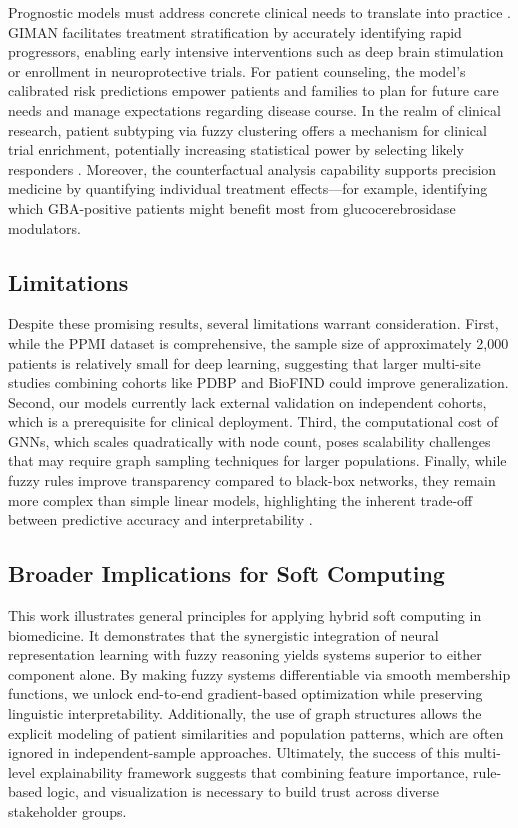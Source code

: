 \documentclass[conference]{IEEEtran}
\begin{document}
Prognostic models must address concrete clinical needs to translate into practice \cite{moons2012risk}. GIMAN facilitates treatment stratification by accurately identifying rapid progressors, enabling early intensive interventions such as deep brain stimulation or enrollment in neuroprotective trials. For patient counseling, the model's calibrated risk predictions empower patients and families to plan for future care needs and manage expectations regarding disease course. In the realm of clinical research, patient subtyping via fuzzy clustering offers a mechanism for clinical trial enrichment, potentially increasing statistical power by selecting likely responders \cite{fereshtehnejad2017clinical}. Moreover, the counterfactual analysis capability supports precision medicine by quantifying individual treatment effects—for example, identifying which GBA-positive patients might benefit most from glucocerebrosidase modulators.

\subsection{Limitations}

Despite these promising results, several limitations warrant consideration. First, while the PPMI dataset is comprehensive, the sample size of approximately 2,000 patients is relatively small for deep learning, suggesting that larger multi-site studies combining cohorts like PDBP and BioFIND could improve generalization. Second, our models currently lack external validation on independent cohorts, which is a prerequisite for clinical deployment. Third, the computational cost of GNNs, which scales quadratically with node count, poses scalability challenges that may require graph sampling techniques \cite{hamilton2017inductive} for larger populations. Finally, while fuzzy rules improve transparency compared to black-box networks, they remain more complex than simple linear models, highlighting the inherent trade-off between predictive accuracy and interpretability \cite{rudin2019stop}.

\subsection{Broader Implications for Soft Computing}

This work illustrates general principles for applying hybrid soft computing in biomedicine. It demonstrates that the synergistic integration of neural representation learning with fuzzy reasoning yields systems superior to either component alone. By making fuzzy systems differentiable via smooth membership functions, we unlock end-to-end gradient-based optimization while preserving linguistic interpretability. Additionally, the use of graph structures allows the explicit modeling of patient similarities and population patterns, which are often ignored in independent-sample approaches. Ultimately, the success of this multi-level explainability framework suggests that combining feature importance, rule-based logic, and visualization is necessary to build trust across diverse stakeholder groups.
\end{document}
